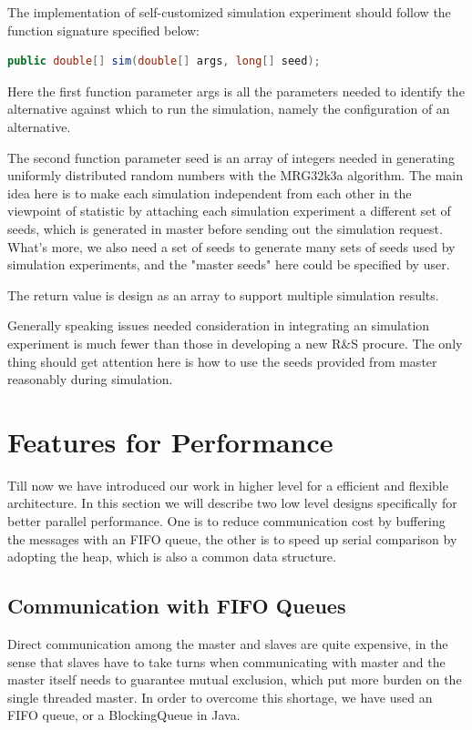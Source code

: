 \documentclass[12pt,a4]{report}
\begin{document}
The implementation of self-customized simulation experiment should follow the function signature specified below:

\begin{lstlisting}[language=Java]
public double[] sim(double[] args, long[] seed);
\end{lstlisting}

Here the first function parameter args is all the parameters needed to identify the alternative against which to run the simulation, namely the configuration of an alternative.

The second function parameter seed is an array of integers needed in generating uniformly distributed random numbers with the MRG32k3a algorithm. The main idea here is to make each simulation independent from each other in the viewpoint of statistic by attaching each simulation experiment a different set of seeds, which is generated in master before sending out the simulation request. What's more, we also need a set of seeds to generate many sets of seeds used by simulation experiments, and the "master seeds" here could be specified by user.

The return value is design as an array to support multiple simulation results.

Generally speaking issues needed consideration in integrating an simulation experiment is much fewer than those in developing a new R\&S procure. The only thing should get attention here is how to use the seeds provided from master reasonably during simulation.

\section{Features for Performance}

Till now we have introduced our work in higher level for a efficient and flexible architecture. In this section we will describe two low level designs specifically for better parallel performance. One is to reduce communication cost by buffering the messages with an FIFO queue, the other is to speed up serial comparison by adopting the heap, which is also a common data structure.

\subsection{Communication with FIFO Queues}

Direct communication among the master and slaves are quite expensive, in the sense that slaves have to take turns when communicating with master and the master itself needs to guarantee mutual exclusion, which put more burden on the single threaded master. In order to overcome this shortage, we have used an FIFO queue, or a BlockingQueue in Java.
\end{document}
